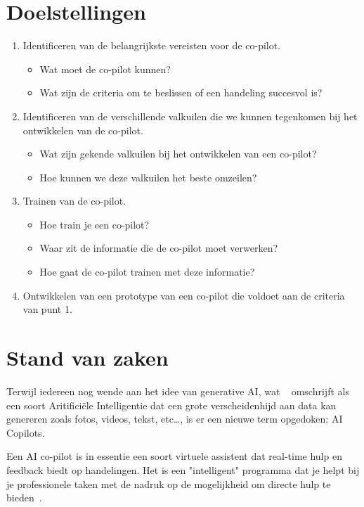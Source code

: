 \documentclass{hogent-article}
\begin{document}
\section{Doelstellingen}
\begin{enumerate}
  \item Identificeren van de belangrijkste vereisten voor de co-pilot. 
    \begin{itemize}
      \item Wat moet de co-pilot kunnen?
      \item Wat zijn de criteria om te beslissen of een handeling succesvol is? 
    \end{itemize}
  \item Identificeren van de verschillende valkuilen die we kunnen tegenkomen bij het ontwikkelen van de co-pilot.
    \begin{itemize}
      \item Wat zijn gekende valkuilen bij het ontwikkelen van een co-pilot?
      \item Hoe kunnen we deze valkuilen het beste omzeilen?
    \end{itemize}
  \item Trainen van de co-pilot.
    \begin{itemize}
      \item Hoe train je een co-pilot?
      \item Waar zit de informatie die de co-pilot moet verwerken? 
      \item Hoe gaat de co-pilot trainen met deze informatie?
    \end{itemize}
  \item Ontwikkelen van een prototype van een co-pilot die voldoet aan de criteria van punt 1.
\end{enumerate}

\section{Stand van zaken}
Terwijl iedereen nog wende aan het idee van generative AI, wat ~\textcite{GenerativeAI2024} omschrijft als een soort Aritificiële Intelligentie dat een grote verscheidenhijd aan data kan genereren zoals fotos, videos, tekst, etc\dots , is er een nieuwe term opgedoken: AI Copilots.

Een AI co-pilot is in essentie een soort virtuele assistent dat real-time hulp en feedback biedt op handelingen. Het is een "intelligent" programma dat je helpt bij je professionele taken met de nadruk op de mogelijkheid om directe hulp te bieden~\autocite{SorabGhaswalla2023}.
\end{document}
